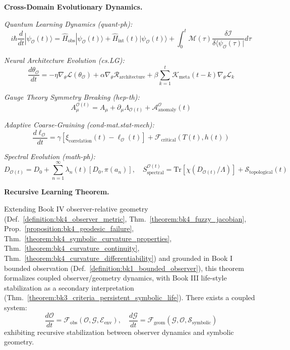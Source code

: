 \begin{scholium}
\vspace{1em}
\noindent\textbf{Cross-Domain Evolutionary Dynamics.}

\textit{Quantum Learning Dynamics (quant-ph):}
\[
i\hbar \frac{d}{dt}|\psi_{\mathcal{O}}(t)\rangle = \hat{H}_{\text{obs}}|\psi_{\mathcal{O}}(t)\rangle + \hat{H}_{\text{int}}(t)|\psi_{\mathcal{O}}(t)\rangle + \int_0^t \mathcal{M}(\tau) \frac{\delta \mathcal{I}}{\delta \langle \psi_{\mathcal{O}}(\tau)|} d\tau
\]

\textit{Neural Architecture Evolution (cs.LG):}
\[
\frac{d\theta_{\mathcal{O}}}{dt} = -\eta \nabla_\theta \mathcal{L}(\theta_{\mathcal{O}}) + \alpha \nabla_\theta \mathcal{R}_{\text{architecture}} + \beta \sum_{k=1}^{t} \mathcal{K}_{\text{meta}}(t-k) \nabla_\theta \mathcal{L}_k
\]

\textit{Gauge Theory Symmetry Breaking (hep-th):}
\[
A_\mu^{\mathcal{O}(t)} = A_\mu + \partial_\mu \Lambda_{\mathcal{O}(t)} + \mathcal{A}_{\text{anomaly}}^{\mathcal{O}}(t)
\]

\textit{Adaptive Coarse-Graining (cond-mat.stat-mech):}
\[
\frac{d\ell_{\mathcal{O}}}{dt} = \gamma[\xi_{\text{correlation}}(t) - \ell_{\mathcal{O}}(t)] + \mathcal{F}_{\text{critical}}(T(t), h(t))
\]

\textit{Spectral Evolution (math-ph):}
\[
D_{\mathcal{O}(t)} = D_0 + \sum_{n=1}^{\infty} \lambda_n(t) [D_0, \pi(a_n)], \quad S_{\text{spectral}}^{\mathcal{O}(t)} = \text{Tr}[\chi(D_{\mathcal{O}(t)}/\Lambda)] + \mathcal{S}_{\text{topological}}(t)
\]

\vspace{1em}
\noindent\textbf{Recursive Learning Theorem.}

\begin{theorem}
\label{theorem:bk4_observer_geometry_coevolution}
Extending Book IV observer-relative geometry (Def.~\ref{definition:bk4_observer_metric}, Thm.~\ref{theorem:bk4_fuzzy_jacobian}, Prop.~\ref{proposition:bk4_geodesic_failure}, Thm.~\ref{theorem:bk4_symbolic_curvature_properties}, Thm.~\ref{theorem:bk4_curvature_continuity}, Thm.~\ref{theorem:bk4_curvature_differentiability}) and grounded in Book I bounded observation (Def.~\ref{definition:bk1_bounded_observer}), this theorem formalizes coupled observer/geometry dynamics, with Book III life-style stabilization as a secondary interpretation (Thm.~\ref{theorem:bk3_criteria_persistent_symbolic_life}).
There exists a coupled system:
\[
\frac{d\mathcal{O}}{dt} = \mathcal{F}_{\text{obs}}(\mathcal{O}, \mathcal{G}, \mathcal{E}_{\text{env}}), \quad \frac{d\mathcal{G}}{dt} = \mathcal{F}_{\text{geom}}(\mathcal{G}, \mathcal{O}, \mathcal{S}_{\text{symbolic}})
\]
exhibiting recursive stabilization between observer dynamics and symbolic geometry.
\end{theorem}


\end{scholium}
